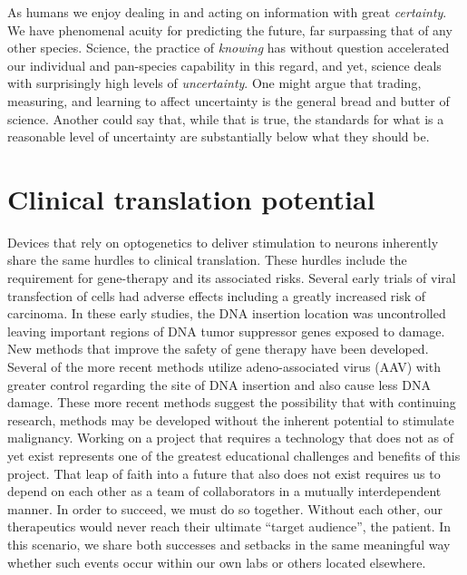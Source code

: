 As humans we enjoy dealing in and acting on information with great
\emph{certainty}. We have phenomenal acuity for predicting the future,
far surpassing that of any other species. Science, the practice of
\emph{knowing} has without question accelerated our individual and
pan-species capability in this regard, and yet, science deals with
surprisingly high levels of \emph{uncertainty}. One might argue that
trading, measuring, and learning to affect uncertainty is the general
bread and butter of science. Another could say that, while that is true,
the standards for what is a reasonable level of uncertainty are
substantially below what they should be.



\section{Clinical translation potential}
\label{sec:clinical-translation-potential}

Devices that rely on optogenetics to deliver stimulation to neurons inherently share the same hurdles to clinical translation.
These hurdles include the requirement for gene-therapy and its associated risks.
Several early trials of viral transfection of cells had adverse effects including a greatly increased risk of carcinoma.
In these early studies, the DNA insertion location was uncontrolled leaving important regions of DNA tumor suppressor genes exposed to damage.
New methods that improve the safety of gene therapy have been developed.
Several of the more recent methods utilize adeno-associated virus (AAV) with greater control regarding the site of DNA insertion and also cause less DNA damage.
These more recent methods suggest the possibility that with continuing research, methods may be developed without the inherent potential to stimulate malignancy.
Working on a project that requires a technology that does not as of yet exist represents one of the greatest educational challenges and benefits of this project.
That leap of faith into a future that also does not exist requires us to depend on each other as a team of collaborators in a mutually interdependent manner.
In order to succeed, we must do so together.
Without each other, our therapeutics would never reach their ultimate “target audience”, the patient.
In this scenario, we share both successes and setbacks in the same meaningful way whether such events occur within our own labs or others located elsewhere.

